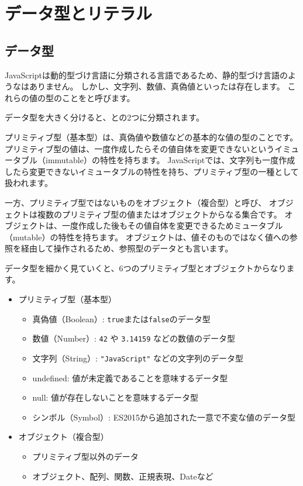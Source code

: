 \hypertarget{data-type-and-literal}{%
\chapter{データ型とリテラル}\label{data-type-and-literal}}
\thispagestyle{frontheadings}

\hypertarget{data-type}{%
\section{データ型}\label{data-type}}

JavaScriptは動的型づけ言語に分類される言語であるため、静的型づけ言語のような\textbf{}はありません。
しかし、文字列、数値、真偽値といった\textbf{}は存在します。
これらの値の型のことを\textbf{}と呼びます。

データ型を大きく分けると、\textbf{}と\textbf{}の2つに分類されます。

プリミティブ型（基本型）は、真偽値や数値などの基本的な値の型のことです。
プリミティブ型の値は、一度作成したらその値自体を変更できないというイミュータブル（immutable）の特性を持ちます。
JavaScriptでは、文字列も一度作成したら変更できないイミュータブルの特性を持ち、プリミティブ型の一種として扱われます。

一方、プリミティブ型ではないものをオブジェクト（複合型）と呼び、
オブジェクトは複数のプリミティブ型の値またはオブジェクトからなる集合です。
オブジェクトは、一度作成した後もその値自体を変更できるためミュータブル（mutable）の特性を持ちます。
オブジェクトは、値そのものではなく値への参照を経由して操作されるため、参照型のデータとも言います。

データ型を細かく見ていくと、6つのプリミティブ型とオブジェクトからなります。

\begin{itemize}
\item
  プリミティブ型（基本型）

  \begin{itemize}
  \item
    真偽値（Boolean）:
    \texttt{true}または\texttt{false}のデータ型
  \item
    数値（Number）: \texttt{42} や
    \texttt{3.14159} などの数値のデータ型
  \item
    文字列（String）: \texttt{"JavaScript"}
    などの文字列のデータ型
  \item
    undefined: 値が未定義であることを意味するデータ型
  \item
    null: 値が存在しないことを意味するデータ型
  \item
    シンボル（Symbol）: ES2015から追加された一意で不変な値のデータ型
  \end{itemize}
\item
  オブジェクト（複合型）

  \begin{itemize}
  \item
    プリミティブ型以外のデータ
  \item
    オブジェクト、配列、関数、正規表現、Dateなど
  \end{itemize}
\end{itemize}

